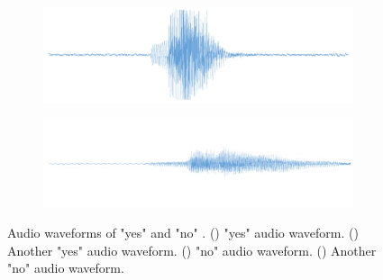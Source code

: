 \begin{figure}[h!]
	\begin{subfigure}{0.45\textwidth}
		\includegraphics[width=\linewidth]{Images/DataMining/WaveformNoFirst.jpg}
		\caption{}    %
		\label{subfig:WaveformNoFirst}
	\end{subfigure}
	\hfill
	\begin{subfigure}{0.45\textwidth}
		\includegraphics[width=\linewidth]{Images/DataMining/WaveformNoSecond.jpg}
		\caption{}    %
		\label{subfig:WaveformNoSecond}
	\end{subfigure}
	
	\caption{Audio waveforms of "yes" and "no" \cite{Warden:2019}. () "yes" audio waveform. () Another "yes" audio waveform. () "no" audio waveform. () Another "no" audio waveform.}
	\label{fig:audioWaveforms}
\end{figure}



